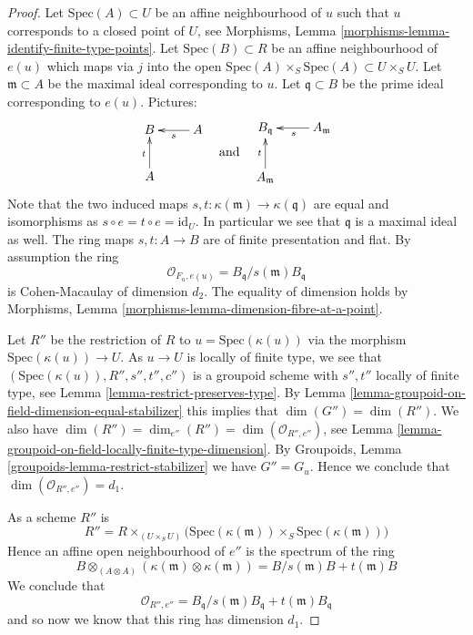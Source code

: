 \begin{proof}
Let $\text{Spec}(A) \subset U$ be an affine neighbourhood of $u$
such that $u$ corresponds to a closed point of $U$, see
Morphisms, Lemma \ref{morphisms-lemma-identify-finite-type-points}.
Let $\text{Spec}(B) \subset R$ be an affine neighbourhood of $e(u)$
which maps via $j$ into the open
$\text{Spec}(A) \times_S \text{Spec}(A) \subset U \times_S U$.
Let $\mathfrak m \subset A$ be the maximal ideal corresponding to $u$.
Let $\mathfrak q \subset B$ be the prime ideal corresponding to $e(u)$.
Pictures:
$$
\vcenter{
\xymatrix{
B & A \ar[l]^s \\
A \ar[u]^t
}
}
\quad\text{and}\quad
\vcenter{
\xymatrix{
B_{\mathfrak q} & A_{\mathfrak m} \ar[l]^s \\
A_{\mathfrak m} \ar[u]^t
}
}
$$
Note that the two induced maps
$s, t : \kappa(\mathfrak m) \to \kappa(\mathfrak q)$
are equal and isomorphisms as $s \circ e = t \circ e = \text{id}_U$.
In particular we see that $\mathfrak q$
is a maximal ideal as well. The ring maps $s, t : A \to B$ are
of finite presentation and flat. By assumption the ring
$$
\mathcal{O}_{F_u, e(u)} = B_{\mathfrak q}/s(\mathfrak m)B_{\mathfrak q}
$$
is Cohen-Macaulay of dimension $d_2$. The equality of dimension holds by
Morphisms, Lemma \ref{morphisms-lemma-dimension-fibre-at-a-point}.

\medskip\noindent
Let $R''$ be the restriction of $R$ to $u = \text{Spec}(\kappa(u))$
via the morphism $\text{Spec}(\kappa(u)) \to U$.
As $u \to U$ is locally of finite type,
we see that $(\text{Spec}(\kappa(u)), R'', s'', t'', c'')$
is a groupoid scheme with $s'', t''$ locally of finite type, see
Lemma \ref{lemma-restrict-preserves-type}.
By
Lemma \ref{lemma-groupoid-on-field-dimension-equal-stabilizer}
this implies that $\dim(G'') = \dim(R'')$. We also have
$\dim(R'') = \dim_{e''}(R'') = \dim(\mathcal{O}_{R'', e''})$, see
Lemma \ref{lemma-groupoid-on-field-locally-finite-type-dimension}.
By
Groupoids, Lemma \ref{groupoids-lemma-restrict-stabilizer}
we have $G'' = G_u$. Hence we conclude that
$\dim(\mathcal{O}_{R'', e''}) = d_1$.

\medskip\noindent
As a scheme $R''$ is
$$
R'' =
R \times_{(U \times_S U)}
\Big(
\text{Spec}(\kappa(\mathfrak m)) \times_S \text{Spec}(\kappa(\mathfrak m))
\Big)
$$
Hence an affine open neighbourhood of $e''$ is the spectrum of the ring
$$
B \otimes_{(A \otimes A)} (\kappa(\mathfrak m) \otimes \kappa(\mathfrak m))
=
B/s(\mathfrak m)B + t(\mathfrak m)B
$$
We conclude that
$$
\mathcal{O}_{R'', e''} =
B_{\mathfrak q}/s(\mathfrak m)B_{\mathfrak q} + t(\mathfrak m)B_{\mathfrak q}
$$
and so now we know that this ring has dimension $d_1$.


\end{proof}
